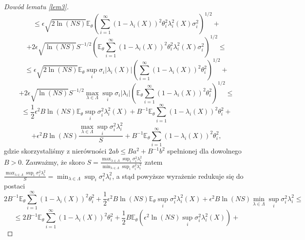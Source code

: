\documentclass{mwart}
\begin{document}
\begin{proof}[Dowód lematu \ref{lem3}]
\begin{displaymath}
\leq \epsilon\sqrt{2\ln (NS)}\mathbb{E}_{\theta}\left(\sum_{i=1}^{\infty}(1-\lambda_i(X))^2\theta_i^2\lambda_i^2(X)\sigma_i^2\right)^{1/2}+
\end{displaymath}
\begin{displaymath}
+2\epsilon\sqrt{\ln (NS)}S^{-1/2}\left(\mathbb{E}_{\theta}\sum_{i=1}^{\infty}(1-\lambda_i(X))^2\theta_i^2\lambda_i^2(X)\sigma_i^2\right)^{1/2}\leq
\end{displaymath}
\begin{displaymath}
\leq \epsilon\sqrt{2\ln (NS)}\mathbb{E}_{\theta}\sup_i\sigma_i|\lambda_i(X)|\left(\sum_{i=1}^{\infty}(1-\lambda_i(X))^2\theta_i^2\right)^{1/2}+
\end{displaymath}
\begin{displaymath}
+2\epsilon\sqrt{\ln (NS)}S^{-1/2}\max_{\lambda\in \Lambda}\sup_i\sigma_i|\lambda_i|\left(\mathbb{E}_{\theta}\sum_{i=1}^{\infty}(1-\lambda_i(X))^2\theta_i^2\right)^{1/2}\leq
\end{displaymath}
\begin{displaymath}
\leq \frac{1}{2}\epsilon^2B\ln (NS)\mathbb{E}_{\theta}\sup_i\sigma_i^2\lambda_i^2(X)+B^{-1}\mathbb{E}_{\theta}\sum_{i=1}^{\infty}(1-\lambda_i(X))^2\theta_i^2+
\end{displaymath}
\begin{displaymath}
+\epsilon^2B\ln (NS)\frac{\max_{\lambda\in \Lambda}\sup_i\sigma_i^2\lambda_i^2}{S}+B^{-1}\mathbb{E}_{\theta}\sum_{i=1}^{\infty}(1-\lambda_i(X))^2\theta_i^2,
\end{displaymath}
gdzie skorzystaliśmy z nierówności $2ab\leq Ba^2+B^{-1}b^2$ spełnionej dla dowolnego $B>0$.
Zauważmy, że skoro $S=\frac{\max_{\lambda\in \Lambda}\sup_i\sigma_i^2\lambda_i^2}{\min_{\lambda\in \Lambda}\sup_i\sigma_i^2\lambda_i^2}$ zatem $\frac{\max_{\lambda\in \Lambda}\sup_i\sigma_i^2\lambda_i^2}{S}=\min_{\lambda\in \Lambda}\sup_i\sigma_i^2\lambda_i^2$, a stąd powyższe wyrażenie redukuje się do postaci
\begin{displaymath}
2B^{-1}\mathbb{E}_{\theta}\sum_{i=1}^{\infty}(1-\lambda_i(X))^2\theta_i^2+\frac{1}{2}\epsilon^2B\ln (NS)\mathbb{E}_{\theta}\sup_i\sigma_i^2\lambda_i^2(X)+\epsilon^2B\ln (NS)\min_{\lambda\in \Lambda}\sup_i\sigma_i^2\lambda_i^2\leq
\end{displaymath}
\begin{displaymath}
\leq 2B^{-1}\mathbb{E}_{\theta}\sum_{i=1}^{\infty}(1-\lambda_i(X))^2\theta_i^2+\frac{1}{2}B\mathbb{E}_{\theta}\left(\epsilon^2\ln (NS)\sup_i\sigma_i^2\lambda_i^2(X)\right)+

\end{displaymath}
\end{proof}
\end{document}
